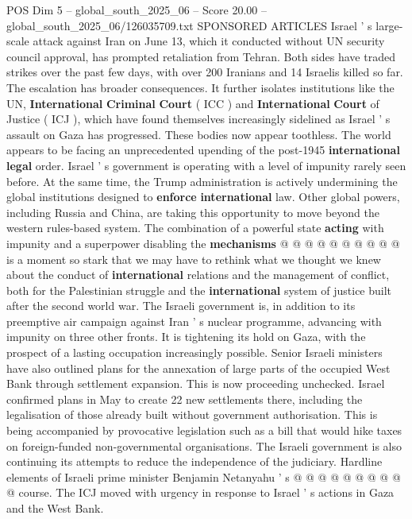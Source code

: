 \begin{textsample}{POS Dim 5 – global\_south\_2025\_06 – Score 20.00 – global\_south\_2025\_06/126035709.txt}  \label{ex:f5_pos_051}
SPONSORED ARTICLES Israel ' s large-scale attack against Iran on June 13, which it conducted without UN security council approval, has prompted retaliation from Tehran.
Both sides have traded strikes over the past few days, with over 200 Iranians and 14 Israelis killed so far.
The escalation has broader consequences.
It further isolates institutions like the UN, \textbf{International} \textbf{Criminal} \textbf{Court} ( ICC ) and \textbf{International} \textbf{Court} of Justice ( ICJ ), which have found themselves increasingly sidelined as Israel ' s assault on Gaza has progressed.
These bodies now appear toothless.
The world appears to be facing an unprecedented upending of the post-1945 \textbf{international} \textbf{legal} order.
Israel ' s government is operating with a level of impunity rarely seen before.
At the same time, the Trump administration is actively undermining the global institutions designed to \textbf{enforce} \textbf{international} law.
Other global powers, including Russia and China, are taking this opportunity to move beyond the western rules-based system.
The combination of a powerful state \textbf{acting} with impunity and a superpower disabling the \textbf{mechanisms} @ @ @ @ @ @ @ @ @ @ is a moment so stark that we may have to rethink what we thought we knew about the conduct of \textbf{international} relations and the management of conflict, both for the Palestinian struggle and the \textbf{international} system of justice built after the second world war.
The Israeli government is, in addition to its preemptive air campaign against Iran ' s nuclear programme, advancing with impunity on three other fronts.
It is tightening its hold on Gaza, with the prospect of a lasting occupation increasingly possible.
Senior Israeli ministers have also outlined plans for the annexation of large parts of the occupied West Bank through settlement expansion.
This is now proceeding unchecked.
Israel confirmed plans in May to create 22 new settlements there, including the legalisation of those already built without government authorisation.
This is being accompanied by provocative legislation such as a bill that would hike taxes on foreign-funded non-governmental organisations.
The Israeli government is also continuing its attempts to reduce the independence of the judiciary.
Hardline elements of Israeli prime minister Benjamin Netanyahu ' s @ @ @ @ @ @ @ @ @ @ course.
The ICJ moved with urgency in response to Israel ' s actions in Gaza and the West Bank.

\end{textsample}
